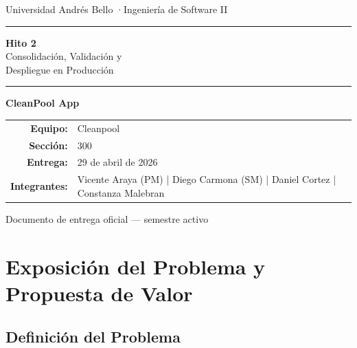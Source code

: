 \documentclass[11pt, a4paper]{article}
\newcommand{\nombreequipo}{Cleanpool}
\newcommand{\nombreproyecto}{CleanPool App}
\newcommand{\integrantes}{%
  Vicente Araya (PM) \quad|\quad
  Diego Carmona (SM) \quad|\quad
  Daniel Cortez \quad|\quad
  Constanza Malebran
}
\newcommand{\seccion}{300}
\newcommand{\fechaentrega}{29 de abril de 2026}
\begin{document}

\thispagestyle{empty}
\begin{center}
  \vspace*{1.5cm}

  {\small\color{gray} Universidad Andrés Bello \quad·\quad Ingeniería de Software II}

  \vspace{1cm}
  \textcolor{primary}{\rule{\linewidth}{1.5pt}}
  \vspace{0.4cm}

  {\Huge\bfseries\color{primary} Hito 2}\\[0.5em]
  {\LARGE Consolidación, Validación y\\Despliegue en Producción}

  \vspace{0.4cm}
  \textcolor{primary}{\rule{\linewidth}{1.5pt}}
  \vspace{1.2cm}

  {\Large\bfseries \nombreproyecto}

  \vspace{1cm}

  \begin{tabular}{rl}
    \textbf{Equipo:}    & \nombreequipo \\[4pt]
    \textbf{Sección:}   & \seccion \\[4pt]
    \textbf{Entrega:}   & \fechaentrega \\[4pt]
    \textbf{Integrantes:} & \parbox[t]{9cm}{\integrantes}
  \end{tabular}

  \vfill

  {\small\color{gray} Documento de entrega oficial — semestre activo}
\end{center}

\newpage

\tableofcontents
\newpage

\section{Exposición del Problema y Propuesta de Valor}

\subsection{Definición del Problema}
\end{document}
